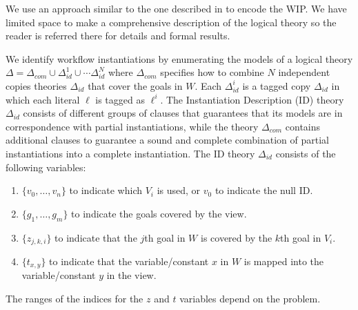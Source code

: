 \documentclass{llncs}
\begin{document}
We use an approach similar to the one described in \cite{arvelo:aaai06} to
encode the WIP. We have limited space to make a comprehensive description of
the logical theory so the reader is referred there for details and formal results.

We identify workflow instantiations by enumerating the models of a logical
theory $\Delta=\Delta_{com}\cup\Delta_{id}^1\cup\cdots\Delta_{id}^N$
where $\Delta_{com}$ specifies how to combine $N$ independent copies theories
$\Delta_{id}$ that cover the goals in $W$.
Each $\Delta^i_{id}$ is a tagged copy $\Delta_{id}$ in which each literal
$\ell$ is tagged as $\ell^i$.
The Instantiation Description (ID) theory $\Delta_{id}$ consists of different
groups of clauses that guarantees that its models are in correspondence with
partial instantiations, while the theory $\Delta_{com}$ contains additional
clauses to guarantee a sound and complete combination of partial instantiations
into a complete instantiation.
The ID theory $\Delta_{id}$ consists of the following variables:
\begin{enumerate}[--]
\item $\{v_0,\ldots,v_n\}$ to indicate which $V_i$ is used, or $v_0$ to indicate the null ID.
\item $\{g_1,\ldots,g_m\}$ to indicate the goals covered by the view.
\item $\{z_{j,k,i}\}$ to indicate that the $j$th goal in $W$ is covered by the $k$th goal in $V_i$.
\item $\{t_{x,y}\}$ to indicate that the variable/constant $x$ in $W$ is mapped into the
      variable/constant $y$ in the view.
\end{enumerate}
The ranges of the indices for the $z$ and $t$ variables depend on the problem.
\end{document}

